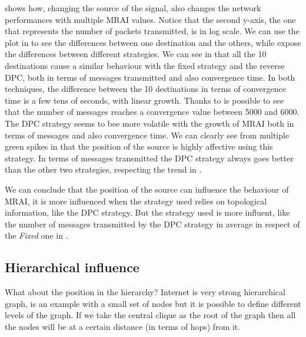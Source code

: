  shows how, changing the source of the signal,
also changes the network performances with multiple \ac{MRAI} values.
Notice that the second y-axis, the one that represents the number of packets
transmitted, is in log scale.
We can use the plot in  to see the
differences between one destination and the others, while 
expose the differences between different strategies.
We can see in  that all the \num{10} destinations
cause a similar behaviour with the fixed strategy and the reverse \ac{DPC}, both
in terms of messages transmitted and also convergence time.
In both techniques, the difference between the \num{10} destinations in terms of
convergence time is a few tens of seconds, with linear growth.
Thanks to  is possible to see that the
number of messages reaches a convergence value between \num{5000} and
\num{6000}.
The \ac{DPC} strategy seems to bee more volatile with the growth of \ac{MRAI}
both in terms of messages and also convergence time.
We can clearly see from multiple green spikes in 
that the position of the source is highly affective using this strategy.
In terms of messages transmitted the \ac{DPC} strategy always goes better than
the other two strategies, respecting the trend in .


We can conclude that the position of the source can influence the behaviour
of \ac{MRAI}, it is more influenced when the strategy used relies on topological
information, like the \ac{DPC} strategy.
But the strategy used is more influent, like the number of messages transmitted
by the \ac{DPC} strategy in average in respect of the \textit{Fixed} one in
.

\subsection{Hierarchical influence}
\label{subsec:hierarchical_influence}

What about the position in the hierarchy?
Internet is very strong hierarchical graph, 
is an example with a small set of nodes but it is possible to define different levels
of the graph.
If we take the central clique as the root of the graph then all the nodes will
be at a certain distance (in terms of hops) from it.

